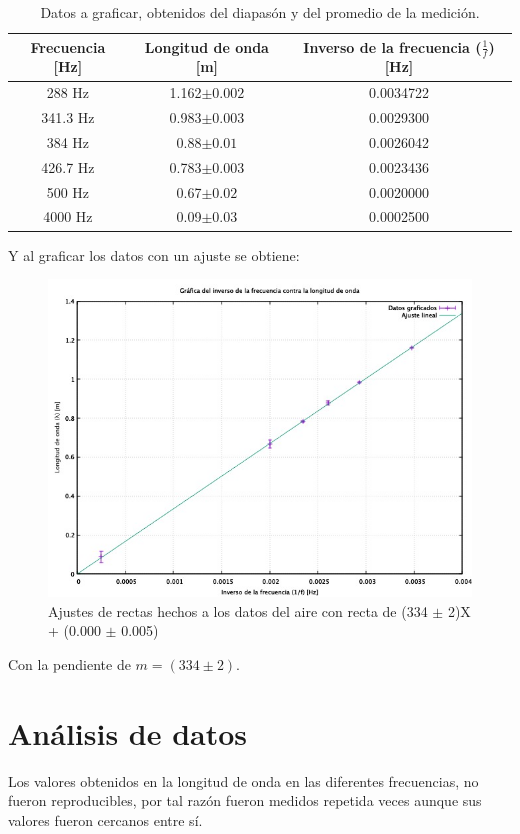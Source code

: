 \documentclass[10pt,a4paper]{article}
\begin{document}
\begin{table}[H]
  \centering
    \begin{tabular}{|c|c|c|} \hline
    Frecuencia [Hz] & Longitud de onda [m] & Inverso de la frecuencia ($\frac{1}{f}$) [Hz] \\ \hline
    288 Hz & 1.162$\pm0.002$ & 0.0034722 \\ \hline
    341.3 Hz & 0.983$\pm0.003$ & 0.0029300 \\ \hline
    384 Hz & 0.88$\pm0.01$ & 0.0026042 \\ \hline
    426.7 Hz & 0.783$\pm0.003$ & 0.0023436 \\ \hline
    500 Hz & 0.67$\pm0.02$ & 0.0020000 \\ \hline
    4000 Hz & 0.09$\pm0.03$ & 0.0002500 \\ \hline
    \end{tabular}%
  \caption{Datos a graficar, obtenidos del diapasón y del promedio de la medición.}
\end{table}%
 
 Y al graficar los datos con un ajuste se obtiene:
 
 \begin{figure}[H]
\includegraphics[scale=0.5]{grafica.jpeg}
\centering
\caption{Ajustes de rectas hechos a los datos del aire con recta de (334 $\pm$ 2)X + (0.000 $\pm$ 0.005)}
\end{figure}

Con la pendiente de $m = (334\pm2)$.

\section{Análisis de datos}
Los valores obtenidos en la longitud de onda en las diferentes frecuencias, no fueron reproducibles, por tal razón fueron medidos repetida veces aunque  sus valores fueron cercanos entre sí.
\end{document}
